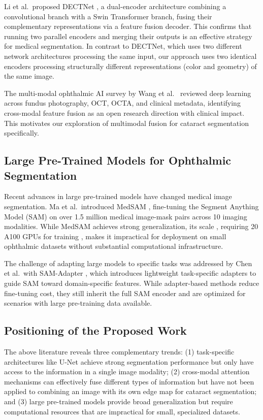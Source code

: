 Li et al.\ proposed DECTNet \cite{li2024dectnet}, a dual-encoder architecture combining a convolutional branch with a Swin Transformer branch, fusing their complementary representations via a feature fusion decoder. This confirms that running two parallel encoders and merging their outputs is an effective strategy for medical segmentation. In contrast to DECTNet, which uses two different network architectures processing the same input, our approach uses two identical encoders processing structurally different representations (color and geometry) of the same image.

The multi-modal ophthalmic AI survey by Wang et al.\ \cite{wang2024multimodal} reviewed deep learning across fundus photography, OCT, OCTA, and clinical metadata, identifying cross-modal feature fusion as an open research direction with clinical impact. This motivates our exploration of multimodal fusion for cataract segmentation specifically.

\subsection{Large Pre-Trained Models for Ophthalmic Segmentation}

Recent advances in large pre-trained models have changed medical image segmentation. Ma et al.\ introduced MedSAM \cite{ma2024medsam}, fine-tuning the Segment Anything Model (SAM) on over 1.5 million medical image-mask pairs across 10 imaging modalities. While MedSAM achieves strong generalization, its scale ,  requiring 20 A100 GPUs for training ,  makes it impractical for deployment on small ophthalmic datasets without substantial computational infrastructure.

The challenge of adapting large models to specific tasks was addressed by Chen et al.\ with SAM-Adapter \cite{chen2023samadapter}, which introduces lightweight task-specific adapters to guide SAM toward domain-specific features. While adapter-based methods reduce fine-tuning cost, they still inherit the full SAM encoder and are optimized for scenarios with large pre-training data available.

\subsection{Positioning of the Proposed Work}

The above literature reveals three complementary trends: (1) task-specific architectures like U-Net achieve strong segmentation performance but only have access to the information in a single image modality; (2) cross-modal attention mechanisms can effectively fuse different types of information but have not been applied to combining an image with its own edge map for cataract segmentation; and (3) large pre-trained models provide broad generalization but require computational resources that are impractical for small, specialized datasets.

